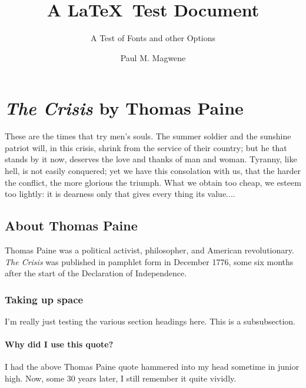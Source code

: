 
\newcommand{\normdistn}{\ensuremath{%
f(x) = 
\frac{1}{\sqrt{2\pi\sigma^2}} e^{-\frac{(x-\mu)^2}{2\sigma^2}}
}}

\newcommand{\varx}{\ensuremath{\frac{1}{n}\sum_{i=1}^{n}(x_i-\mu)}}


\title{\Large A \LaTeX\ Test Document}
\subtitle{\large A Test of Fonts and other Options}
\author{\normalsize Paul M. Magwene}
\date{}

\maketitle
    
\section{\textit{The Crisis} by Thomas Paine}

These are the times that try men's souls. The summer soldier and the sunshine patriot will, in this crisis, shrink from the service of their country; but he that stands by it now, deserves the love and thanks of man and woman. Tyranny, like hell, is not easily conquered; yet we have this consolation with us, that the harder the conflict, the more glorious the triumph. What we obtain too cheap, we esteem too lightly: it is dearness only that gives every thing its value....

\subsection{About Thomas Paine}
Thomas Paine was a political activist, philosopher, and American revolutionary. \textit{The Crisis} was published in pamphlet form in December 1776, some six months after the start of the Declaration of Independence.

\subsubsection{Taking up space}
I'm really just testing the various section headings here.  This is a subsubsection.

\paragraph{Why did I use this quote?} 
I had the above Thomas Paine quote hammered into my head sometime in junior high. Now, some 30 years later, I still remember it quite vividly.


